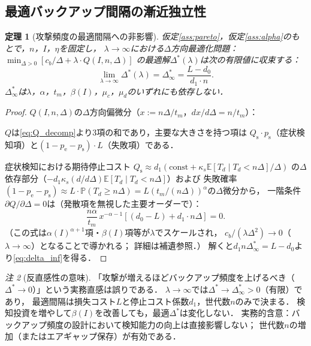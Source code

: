 \documentclass[12pt,a4paper]{article}
\theoremstyle{plain}
\newtheorem{theorem}{定理}[section]
\theoremstyle{definition}
\theoremstyle{remark}
\newtheorem{remark}[theorem]{注}
\newcommand{\E}{\mathbb{E}}
\newcommand{\Prob}{\mathbb{P}}
\newcommand{\pe}{p_{\mathrm{e}}}
\newcommand{\ps}{p_{\mathrm{s}}}
\newcommand{\Qs}{Q_{\mathrm{s}}}
\newcommand{\betaI}{\beta(I)}
\newcommand{\Dopt}{\Delta^{*}}
\begin{document}
\subsection{最適バックアップ間隔の漸近独立性}

\begin{theorem}[攻撃頻度の最適間隔への非影響]\label{thm:delta_inf}
仮定\ref{ass:pareto}，仮定\ref{ass:alpha}のもとで，$n$，$I$，$\eta$を固定し，
$\lambda\to\infty$における$\Delta$方向最適化問題：
$\min_{\Delta>0}[c_b/\Delta+\lambda\cdot Q(I,n,\Delta)]$
の最適解$\Dopt(\lambda)$は次の有限値に収束する：
\begin{equation}\label{eq:delta_inf}
  \lim_{\lambda\to\infty}\Dopt(\lambda) = \Dopt_\infty = \frac{L-d_0}{d_1\cdot n}.
\end{equation}
$\Dopt_\infty$は$\lambda$，$\alpha$，$t_m$，$\betaI$，$\mu_c$，$\mu_d$のいずれにも依存しない．
\end{theorem}

\begin{proof}
$Q(I,n,\Delta)$の$\Delta$方向偏微分（$x:=n\Delta/t_m$，$dx/d\Delta=n/t_m$）：

$Q$は\eqref{eq:Q_decomp}より3項の和であり，主要な大きさを持つ項は
$\Qs\cdot\ps$（症状検知項）と$(1-\pe-\ps)\cdot L$（失敗項）である．

症状検知における期待停止コスト
$\Qs\approx d_1(\text{const}+\kappa_s\E[T_d\mid T_d<n\Delta]/\Delta)$
の$\Delta$依存部分（$-d_1\kappa_s(d/d\Delta)\E[T_d\mid T_d<n\Delta]$）および
失敗確率$(1-\pe-\ps)\approx L\cdot\Prob(T_d\ge n\Delta)=L(t_m/(n\Delta))^\alpha$の$\Delta$微分から，
一階条件$\partial Q/\partial\Delta=0$は（発散項を無視した主要オーダーで）：
\[
  \frac{n\alpha}{t_m}\,x^{-\alpha-1}\!\left[(d_0-L)+d_1\cdot n\Delta\right] = 0.
\]
（この式は$\alpha(I)^{\alpha+1}$項・$\betaI$項等が$\lambda$でスケールされ，
$c_b/(\lambda\Delta^2)\to0$（$\lambda\to\infty$）となることで導かれる；
詳細は補遺参照．）
解くと$d_1 n\Dopt_\infty = L-d_0$より\eqref{eq:delta_inf}を得る．
\end{proof}

\begin{remark}[反直感性の意味]
「攻撃が増えるほどバックアップ頻度を上げるべき（$\Dopt\to0$）」という実務直感は誤りである．
$\lambda\to\infty$では$\Dopt\to\Dopt_\infty>0$（有限）であり，
最適間隔は損失コスト$L$と停止コスト係数$d_1$，世代数$n$のみで決まる．
検知投資を増やして$\betaI$を改善しても，最適$\Dopt$は変化しない．
実務的含意：バックアップ頻度の設計において検知能力の向上は直接影響しない；
世代数$n$の増加（またはエアギャップ保存）が有効である．
\end{remark}
\end{document}
